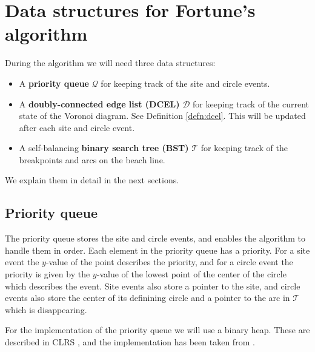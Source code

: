 \chapter{Data structures for Fortune's algorithm}

During the algorithm we will need three data structures:
\begin{itemize}
    \item A \textbf{priority queue} $\mathcal{Q}$ for keeping track of the site and circle events.
    \item A \textbf{doubly-connected edge list (DCEL)} $\mathcal{D}$ for keeping track of the current state of the Voronoi diagram. See Definition \ref{defn:dcel}. This will be updated after each site and circle event.
    \item A self-balancing \textbf{binary search tree (BST)} $\mathcal{T}$ for keeping track of the breakpoints and arcs on the beach line.
\end{itemize}
We explain them in detail in the next sections.

\section{Priority queue}
The priority queue stores the site and circle events, and enables the algorithm to handle them in order. Each element in the priority queue has a priority. For a site event the $y$-value of the point describes the priority, and for a circle event the priority is given by the $y$-value of the lowest point of the center of the circle which describes the event. Site events also store a pointer to the site, and circle events also store the center of its definining circle and a pointer to the arc in $\mathcal{T}$ which is disappearing.

For the implementation of the priority queue we will use a binary heap. These are described in CLRS , and the implementation has been taken from .

